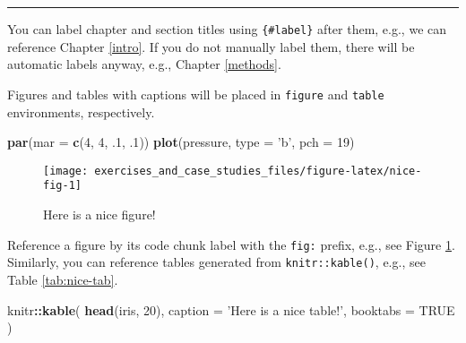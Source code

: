 \documentclass[]{book}
\newenvironment{Shaded}{\begin{snugshade}}{\end{snugshade}}
\newcommand{\DataTypeTok}[1]{\textcolor[rgb]{0.13,0.29,0.53}{#1}}
\newcommand{\DecValTok}[1]{\textcolor[rgb]{0.00,0.00,0.81}{#1}}
\newcommand{\FloatTok}[1]{\textcolor[rgb]{0.00,0.00,0.81}{#1}}
\newcommand{\KeywordTok}[1]{\textcolor[rgb]{0.13,0.29,0.53}{\textbf{#1}}}
\newcommand{\NormalTok}[1]{#1}
\newcommand{\OperatorTok}[1]{\textcolor[rgb]{0.81,0.36,0.00}{\textbf{#1}}}
\newcommand{\OtherTok}[1]{\textcolor[rgb]{0.56,0.35,0.01}{#1}}
\newcommand{\StringTok}[1]{\textcolor[rgb]{0.31,0.60,0.02}{#1}}
\theoremstyle{definition}
\theoremstyle{definition}
\theoremstyle{definition}
\theoremstyle{remark}
\begin{document}
\begin{center}\rule{0.5\linewidth}{\linethickness}\end{center}

You can label chapter and section titles using \texttt{\{\#label\}}
after them, e.g., we can reference Chapter \ref{intro}. If you do not
manually label them, there will be automatic labels anyway, e.g.,
Chapter \ref{methods}.

Figures and tables with captions will be placed in \texttt{figure} and
\texttt{table} environments, respectively.

\begin{Shaded}
\begin{Highlighting}[]
\KeywordTok{par}\NormalTok{(}\DataTypeTok{mar =} \KeywordTok{c}\NormalTok{(}\DecValTok{4}\NormalTok{, }\DecValTok{4}\NormalTok{, }\FloatTok{.1}\NormalTok{, }\FloatTok{.1}\NormalTok{))}
\KeywordTok{plot}\NormalTok{(pressure, }\DataTypeTok{type =} \StringTok{'b'}\NormalTok{, }\DataTypeTok{pch =} \DecValTok{19}\NormalTok{)}
\end{Highlighting}
\end{Shaded}

\begin{figure}

{\centering \texttt{[image: exercises\_and\_case\_studies\_files/figure-latex/nice-fig-1]} 

}

\caption{Here is a nice figure!}\label{fig:nice-fig}
\end{figure}

Reference a figure by its code chunk label with the \texttt{fig:}
prefix, e.g., see Figure \ref{fig:nice-fig}. Similarly, you can
reference tables generated from \texttt{knitr::kable()}, e.g., see Table
\ref{tab:nice-tab}.

\begin{Shaded}
\begin{Highlighting}[]
\NormalTok{knitr}\OperatorTok{::}\KeywordTok{kable}\NormalTok{(}
  \KeywordTok{head}\NormalTok{(iris, }\DecValTok{20}\NormalTok{), }\DataTypeTok{caption =} \StringTok{'Here is a nice table!'}\NormalTok{,}
  \DataTypeTok{booktabs =} \OtherTok{TRUE}
\NormalTok{)}
\end{Highlighting}
\end{Shaded}
\end{document}
